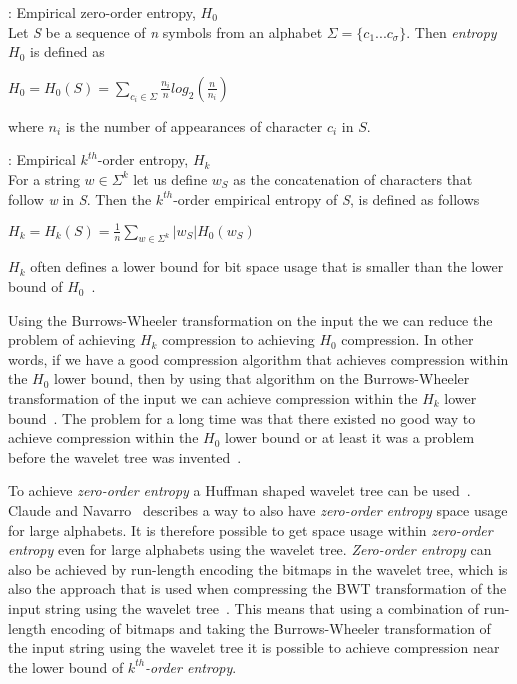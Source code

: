 \begin{mdframed}[nobreak, linecolor=lightgray, linewidth=2pt]
\begin{definition}: Empirical zero-order entropy, $H_0$ \\
Let \textit{S} be a sequence of \textit{n} symbols from an alphabet $\Sigma = \lbrace c_1 ... c_\sigma \rbrace$.
Then \textit{entropy} $H_0$ is defined as
\begin{center}
$H_0 = H_0(S) = \sum\limits_{c_i \in \Sigma} \frac{n_i}{n} log_2(\frac{n}{n_i})$
\end{center}
where $n_i$ is the number of appearances of character $c_i$ in $S$.
\end{definition}
\begin{definition}: Empirical $k^{th}$-order entropy, $H_k$ \\
For a string $w \in \Sigma^k$ let us define $w_S$ as the concatenation of characters that follow \textit{w} in \textit{S}. 
Then the $k^{th}$-order empirical entropy of \textit{S}, is defined as follows
\begin{center}
$H_k = H_k(S) = \frac{1}{n} \sum\limits_{w \in \Sigma^k} | w_S |H_0(w_S)$
\end{center}
\end{definition}
\end{mdframed}
$H_k$ often defines a lower bound for bit space usage that is smaller than the lower bound of $H_0$~.

Using the Burrows-Wheeler transformation on the input the we can reduce the problem of achieving $H_k$ compression to achieving $H_0$ compression.
In other words, if we have a good compression algorithm that achieves compression within the $H_0$ lower bound, then by using that algorithm on the Burrows-Wheeler transformation of the input we can achieve compression within the $H_k$ lower bound~.
The problem for a long time was that there existed no good way to achieve compression within the $H_0$ lower bound or at least it was a problem before the wavelet tree was invented~.

To achieve \textit{zero-order entropy} a Huffman shaped wavelet tree can be used~. Claude and Navarro~ describes a way to also have \textit{zero-order entropy} space usage for large alphabets. 
It is therefore possible to get space usage within \textit{zero-order entropy} even for large alphabets using the wavelet tree. 
\textit{Zero-order entropy} can also be achieved by run-length encoding the bitmaps in the wavelet tree, which is also the approach that is used when compressing the BWT transformation of the input string using the wavelet tree~.
This means that using a combination of run-length encoding of bitmaps and taking the Burrows-Wheeler transformation of the input string using the wavelet tree it is possible to achieve compression near the lower bound of \textit{$k^{th}$-order entropy}.

